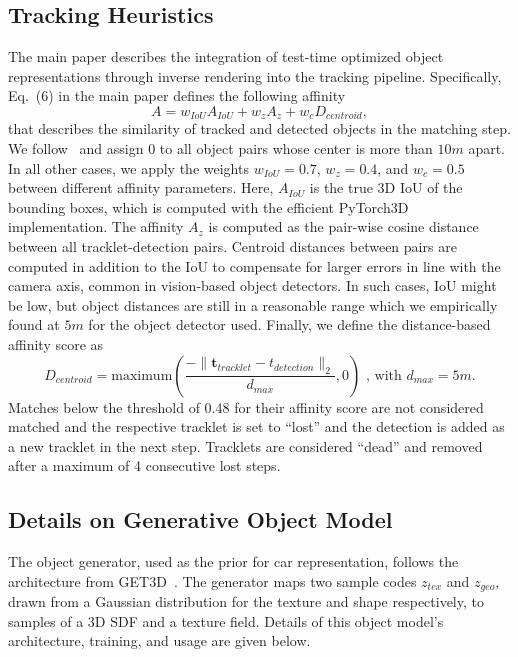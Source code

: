 \subsection{Tracking Heuristics}
%
The main paper describes the integration of test-time optimized object representations through inverse rendering into the tracking pipeline. Specifically, Eq.~(6) in the main paper defines the following affinity
\begin{equation}\label{eq:affinity}
    A = w_{IoU} A_{IoU} + w_{z} A_{z} + w_{c} D_{centroid},
\end{equation}
that describes the similarity of tracked and detected objects in the matching step. We follow~\cite{caesar2020nuscenes, weng2020AB3DMOT} and assign $0$ to all object pairs whose center is more than $10m$ apart. In all other cases, we apply the weights $w_{IoU} = 0.7$, $w_{z} = 0.4$, and $w_{c} = 0.5$ between different affinity parameters. Here, $A_{IoU}$ is the true 3D IoU of the bounding boxes, which is computed with the efficient PyTorch3D~\cite{ravi2020pytorch3d} implementation. The affinity $A_{z}$ is computed as the pair-wise cosine distance between all tracklet-detection pairs. 
Centroid distances between pairs are computed in addition to the IoU to compensate for larger errors in line with the camera axis, common in vision-based object detectors. In such cases, IoU might be low, but object distances are still in a reasonable range which we empirically found at $5m$ for the object detector used. Finally, we define the distance-based affinity score as 
\begin{equation}
    D_{centroid} = \text{maximum}\left( \frac{-\| \mathbf{t}_{tracklet} - {t}_{detection} \|_2}{d_{max}}, 0\right) \text{ , with $d_{max} = 5 m$}.
\end{equation}
%
Matches below the threshold of $0.48$ for their affinity score are not considered matched and the respective tracklet is set to ``lost'' and the detection is added as a new tracklet in the next step. Tracklets are considered ``dead'' and removed after a maximum of 4 consecutive lost steps.


\subsection{Details on Generative Object Model}
%
The object generator, used as the prior for car representation, follows the architecture from GET3D~\cite{gao2022get3d}. The generator maps two sample codes $z_{tex}$ and $z_{geo}$, drawn from a Gaussian distribution for the texture and shape respectively, to samples of a 3D SDF and a texture field. Details of this object model's architecture, training, and usage are given below.

